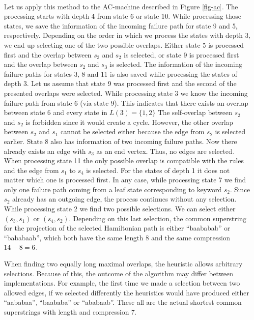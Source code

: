 \documentclass[english,twoside,censored,csm,algorithms-track-2020]{HYthesisML}
\theoremstyle{plain}
\theoremstyle{definition}
\begin{document}
\begin{testexample}~\label{examplelabeldummy}\\
Let us apply this method to the AC-machine described in Figure \ref{fig-ac}. The processing starts
with depth 4 from state 6 or state 10. While processing those states, we save the information of
the incoming failure path for state 9 and 5, respectively. Depending on the order in which we process
the states with depth 3, we end up selecting one of the two possible overlaps. Either state 5
is processed first and the overlap between $s_3$ and $s_2$ is selected, or state 9 is processed
first and the overlap between $s_2$ and $s_3$ is selected. The information of the incoming failure
paths for states 3, 8 and 11 is also saved while processing the states of depth 3. Let us assume
that state 9 was processed first and the second of the presented overlaps were selected.
While processing state 3 we know the incoming failure path from state 6 (via
state 9). This indicates that there exists an overlap between state 6 and every state
in $L(3)=\{1,2\}$ The self-overlap between $s_2$ and $s_2$ is forbidden since it would
create a cycle. However, the other overlap between $s_2$ and $s_1$ cannot be selected either because
the edge from $s_2$ is selected earlier. State 8 also has information of two incoming failure
paths. Now there already exists an edge with $s_3$ as an end vertex. Thus, no edges are selected.
When processing state 11 the only possible overlap is compatible with the rules and the edge
from $s_1$ to $s_4$ is selected. For the states of depth 1 it does not matter which one is processed
first. In any case, while processing state 7 we find only one failure path coming from a leaf state
corresponding to keyword $s_2$. Since $s_2$ already has an outgoing edge, the process continues
without any selection. While processing state 2 we find two possible selections. We can select
either $(s_3,s_1)$ or $(s_4,s_2)$. Depending on this last selection, the common superstring for
the projection of the selected Hamiltonian path is either ``baababab'' or ``bababaab'', which
both have the same length 8 and the same compression $14-8=6$.

When finding two equally long maximal overlaps, the heuristic allows arbitrary selections.
Because of this, the outcome of the algorithm may differ between implementations. For example,
the first time
we made a selection between two allowed edges, if we selected differently the heuristics would
have produced either ``aababaa'', ``baababa'' or ``ababaab''. These all are the actual shortest common
superstrings with length and compression 7.
\end{testexample}
\end{document}
